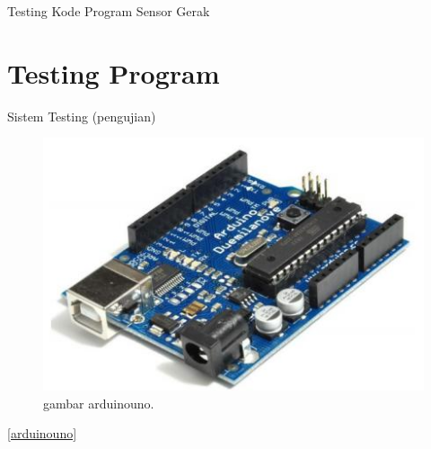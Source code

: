 \documentclass{article}
\begin{document}
Testing Kode Program Sensor Gerak

\section {Testing Program}
Sistem Testing (pengujian)

\begin{figure}[ht]
\centerline{\includegraphics[width=1\textwidth]{figures/arduinouno.JPG}}
\caption{gambar arduinouno.}
\label{arduinouno.JPG}
\end{figure}
\ref{arduinouno}
\end{document}
